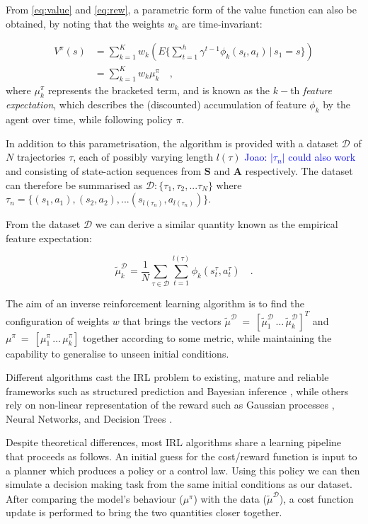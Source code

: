 \documentclass[letterpaper]{article}
\newcommand{\jm}[1]{\textcolor{blue}{Joao: #1}}
\newcommand{\jm}[1]{}
\begin{document}
From \eqref{eq:value} and \eqref{eq:rew}, a parametric form of the value function can also be obtained, by noting that the weights $w_k$ are time-invariant:

\begin{align}
 	V^{\pi}(s) &= \sum^K_{k=1}w_k\left(E\{\sum_{t = 1}^h \gamma^{t-1}\phi_k(s_t,a_t)\,\vert\, s_1 = s\}\right)\\
&= \sum^K_{k=1}w_k\mu^\pi_k\quad,
\end{align}
where $\mu^{\pi}_k$ represents the bracketed term, and is known as the $k-$th \emph{feature expectation}, which describes the (discounted) accumulation of feature $\phi_k$ by the agent over time, while following policy $\pi$.

In addition to this parametrisation, the algorithm is provided with a dataset ${\mathcal{D}}$ of $N$ trajectories $\tau$, each of possibly varying length $l({\tau})$ \jm{$|\tau_n|$ could also work} and consisting of state-action sequences from $\mathbf{S}$ and $\mathbf{A}$ respectively. The dataset can therefore be summarised as $\mathcal{D}:\big\{ \tau_1,\tau_2,...\tau_N \big\}$ where $\tau_n = \{(s_1,a_1),(s_2,a_2),...(s_{l({\tau_n})},a_{l({\tau_n})})\}$.

From the dataset ${\mathcal{D}}$ we can derive a similar quantity known as the empirical feature expectation:

\begin{equation}
	\widetilde{\mu}^{\mathcal{D}}_k =\frac{1}{N}\sum_{\tau\in\mathcal{D}}\sum_{t=1}^{l({\tau})}\phi_k(s^\tau_t,a^\tau_t)\quad. \label{eqn:empirical_fe}
\end{equation}

The aim of an inverse reinforcement learning algorithm is to find the configuration of weights $w$ that brings the vectors $\widetilde\mu^{\mathcal{D}}~=~[\widetilde\mu^{\mathcal{D}}_1\,\ldots\,\widetilde\mu^{\mathcal{D}}_k]^T$ and $\mu^{\pi}~=~[\mu^\pi_1\,\ldots\,\mu^\pi_k]$ together according to some metric, while maintaining the capability to generalise to unseen initial conditions.

Different algorithms cast the IRL problem to existing, mature and reliable frameworks such as structured prediction \cite{ratliff2006maximum} and Bayesian inference \cite{ramachandran2007bayesian}, while others rely on non-linear representation of the reward such as Gaussian processes \cite{levine2011nonlinear}, Neural Networks, and Decision Trees \cite{ratliff200w7boosting}. 

Despite theoretical differences, most IRL algorithms share a learning pipeline that proceeds as follows. An initial guess for the cost/reward function is input to a planner which produces a policy or a control law. Using this policy we can then simulate a decision making task from the same initial conditions as our dataset. After comparing the model's behaviour ($\mu^{\pi}$)  with the data ($\widetilde{\mu}^{\mathcal{D}}$), a cost function update is performed to bring the two quantities closer together.
\end{document}
